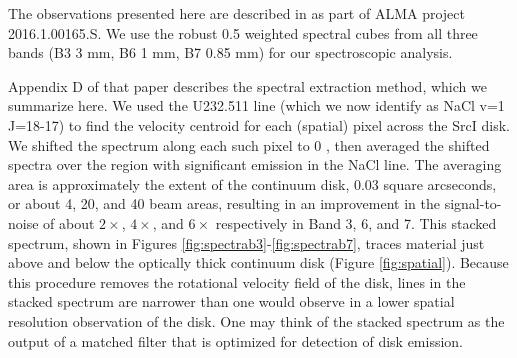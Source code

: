 \documentclass[twocolumn]{aastex62}
\newcommand{\sourcei}{SrcI\xspace}
\begin{document}
The observations presented here are described in \citet{Ginsburg2018b} as part
of ALMA project 2016.1.00165.S.  We use the robust 0.5 weighted spectral cubes
from all three bands (B3 3 mm, B6 1 mm, B7 0.85 mm) for our spectroscopic analysis.

Appendix D of that paper describes the spectral extraction method,
which we summarize here.  We used the U232.511 line (which we now identify as
NaCl v=1 J=18-17) to find the velocity centroid for each (spatial) pixel
across the \sourcei disk.  We shifted the spectrum along
each such pixel to 0 \kms, then averaged the shifted spectra over the region with
significant emission in the NaCl line.  
The
averaging area is approximately the extent of the continuum disk, 0.03 square
arcseconds, or about 4, 20, and 40  beam areas, resulting
in an improvement in the signal-to-noise of about $2\times$, $4\times$, and $6\times$
respectively in Band 3, 6, and 7.
This stacked spectrum, shown in Figures \ref{fig:spectrab3}-\ref{fig:spectrab7},
traces material just above and below the optically thick continuum disk
(Figure \ref{fig:spatial}).
%
%
Because this procedure removes the rotational velocity field of the disk,
lines in the stacked spectrum are narrower than one would observe in
a lower spatial resolution observation of the disk.  One may think of the
stacked spectrum as the output of a matched filter that is optimized for
detection of disk emission.


\end{document}
